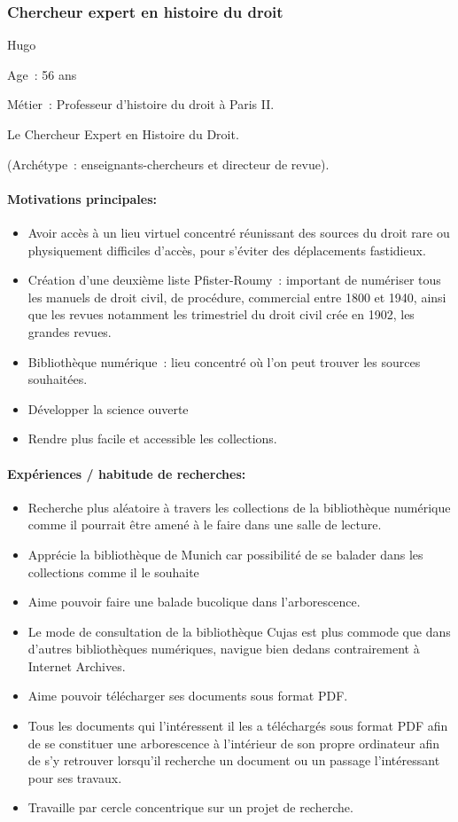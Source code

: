 \subsubsection*{Chercheur expert en histoire du droit}
Hugo

Age : 56 ans

Métier : Professeur d’histoire du droit à Paris II.

Le Chercheur Expert en Histoire du Droit.

(Archétype : enseignants-chercheurs et directeur de revue).

\paragraph*{Motivations principales:}

\begin{itemize}
	\item Avoir accès à un lieu virtuel concentré réunissant des sources du droit rare ou physiquement difficiles d’accès, pour s’éviter des déplacements fastidieux.
\item Création d’une deuxième liste Pfister-Roumy : important de numériser tous les manuels de droit civil, de procédure, commercial entre 1800 et 1940, ainsi que les revues notamment les trimestriel du droit civil crée en 1902, les grandes revues.
\item Bibliothèque numérique : lieu concentré où l’on peut trouver les sources souhaitées.
\item Développer la science ouverte
\item Rendre plus facile et accessible les collections.
\end{itemize} 

\paragraph*{Expériences / habitude de recherches:} 
\begin{itemize}
	\item Recherche plus aléatoire à travers les collections de la bibliothèque numérique comme il pourrait être amené à le faire dans une salle de lecture.
\item Apprécie la bibliothèque de Munich car possibilité de se balader dans les collections comme il le souhaite
\item Aime pouvoir faire une balade bucolique dans l’arborescence.
\item Le mode de consultation de la bibliothèque Cujas est plus commode que dans d’autres bibliothèques numériques, navigue bien dedans contrairement à Internet Archives.
\item Aime pouvoir télécharger ses documents sous format PDF.
\item Tous les documents qui l’intéressent il les a téléchargés sous format PDF afin de se constituer une arborescence à l’intérieur de son propre ordinateur afin de s’y retrouver lorsqu’il recherche un document ou un passage l’intéressant pour ses travaux.
\item Travaille par cercle concentrique sur un projet de recherche.
\end{itemize}

